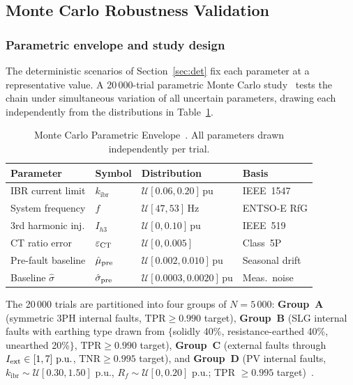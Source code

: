 \documentclass[journal,twoside,10pt]{IEEEtran}
\newcommand{\kibr}{k_{\mathrm{ibr}}}
\newcommand{\pu}{\,\text{p.u.}}
\begin{document}
\subsection{Monte Carlo Robustness Validation}
\label{sec:montecarlo}

\subsubsection{Parametric envelope and study design}

The deterministic scenarios of Section~\ref{sec:det} fix each parameter
at a representative value.  A 20\,000-trial parametric Monte Carlo
study~\cite{SAMBP_TR26} tests the chain under simultaneous variation of
all uncertain parameters, drawing each independently from the distributions
in Table~\ref{tab:mc_params}.

\begin{table}[!t]
\centering
\caption{Monte Carlo Parametric Envelope~\cite{SAMBP_TR26}.
         All parameters drawn independently per trial.}
\label{tab:mc_params}
\renewcommand{\arraystretch}{1.05}
\footnotesize\setlength{\tabcolsep}{3pt}
\begin{tabular}{p{1.9cm}lp{2.5cm}l}
\toprule
Parameter & Symbol & Distribution & Basis \\
\midrule
IBR current limit & $\kibr$ & $\mathcal{U}[0.06,0.20]$\,pu
  & IEEE~1547 \\
System frequency & $f$ & $\mathcal{U}[47,53]$\,Hz
  & ENTSO-E RfG \\
3rd harmonic inj. & $I_{h3}$ & $\mathcal{U}[0,0.10]$\,pu
  & IEEE~519 \\
CT ratio error & $\varepsilon_{\rm CT}$ & $\mathcal{U}[0,0.005]$
  & Class~5P \\
Pre-fault baseline & $\hat{\mu}_{\rm pre}$ & $\mathcal{U}[0.002,0.010]$\,pu
  & Seasonal drift \\
Baseline $\hat{\sigma}$ & $\hat{\sigma}_{\rm pre}$ & $\mathcal{U}[0.0003,0.0020]$\,pu
  & Meas.\ noise \\
\bottomrule
\end{tabular}
\end{table}

The 20\,000 trials are partitioned into four groups of $N = 5\,000$:
\textbf{Group~A} (symmetric 3PH internal faults, $\text{TPR} \geq 0.990$
target), \textbf{Group~B} (SLG internal faults with earthing type drawn
from $\{$solidly 40\%, resistance-earthed 40\%, unearthed 20\%$\}$,
$\text{TPR} \geq 0.990$ target), \textbf{Group~C} (external faults
through $I_{\rm ext} \in [1,7]\,\pu$, $\text{TNR} \geq 0.995$ target),
and \textbf{Group~D} (PV internal faults, $\kibr \sim \mathcal{U}[0.30,1.50]\,\pu$,
$R_f \sim \mathcal{U}[0,0.20]\,\pu$; TPR $\geq 0.995$ target)~\cite{SAMBP_TR62}.
\end{document}
